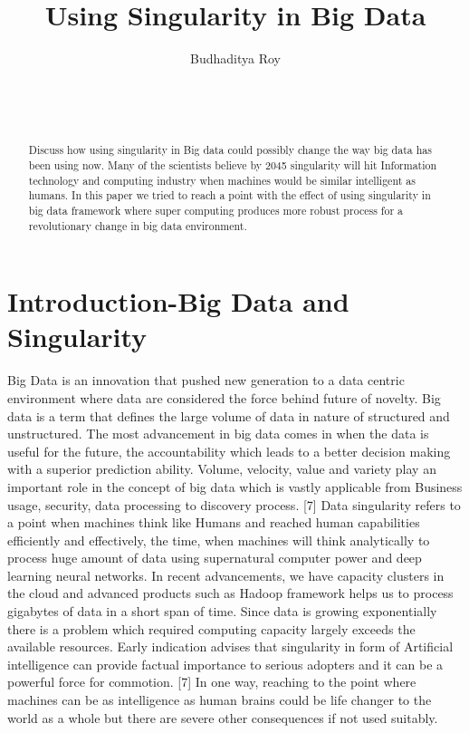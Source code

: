 \documentclass{sig-alternate}
\begin{document}
\title{Using Singularity in Big Data}

\author{
\alignauthor
Budhaditya Roy
\\
       \\
       \\
       \\
}

\maketitle
\begin{abstract}
Discuss how using singularity in Big data could possibly change the way big data has been using now. Many of the scientists believe by 2045 singularity will hit Information technology and computing industry when machines would be similar intelligent as humans. In this paper we tried to reach a point with the effect of using singularity in big data framework where super computing produces more robust process for a revolutionary change in big data environment. 
\end{abstract}




\section{Introduction-Big Data and \\Singularity}
Big Data is an innovation that pushed new generation to a data centric environment where data are considered the force behind future of novelty. Big data is a term that defines the large volume of data in nature of structured and unstructured. The most advancement in big data comes in when the data is useful for the future, the accountability which leads to a better decision making with a superior prediction ability. Volume, velocity, value and variety play an important role in the concept of big data which is vastly applicable from Business usage, security, data processing to discovery process. [7] Data singularity refers to a point when machines think like Humans and reached human capabilities efficiently and effectively, the time, when machines will think analytically to process huge amount of data using supernatural computer power and deep learning neural networks. In recent advancements, we have capacity clusters in the cloud and advanced products such as Hadoop framework helps us to process gigabytes of data in a short span of time. Since data is growing exponentially there is a problem which required computing capacity largely exceeds the available resources. Early indication advises that singularity in form of Artificial intelligence can provide factual importance to serious adopters and it can be a powerful force for commotion. [7] In one way, reaching to the point where machines can be as intelligence as human brains could be life changer to the world as a whole but there are severe other consequences if not used suitably.
\end{document}
